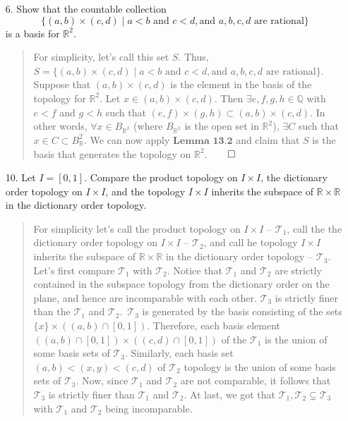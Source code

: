 \documentclass[12pt, a4paper]{article}
\newcommand{\rats}{\mathbb{Q}} %
\newcommand{\reals}{\mathbb{R}} %
\newcommand{\topology}{\mathcal{T}} %
\newcommand\und[1]{\underline{\smash{#1}}}
\begin{document}
\begin{itemize}
\item[6.]
Show that the countable collection
$$\{(a, b) \times (c, d) \mid a < b \mbox{ and } c < d, \mbox{and } a,b,c,d \mbox{ are rational}\}$$
is a basis for $\reals^2$.
\begin{quote}
For simplicity, let's call this set $S$. Thus, $S = \{(a, b) \times (c, d) \mid a < b \mbox{ and } c < d, \mbox{and } a,b,c,d \mbox{ are rational}\}$.
\newline
\newline
Suppose that $(a, b) \times (c, d)$ is the element in the basis of the topology for $\reals^2$. Let $x \in (a, b) \times (c, d)$.
Then $\exists e, f, g, h \in \rats$ with $e < f$ and $g < h$ such that $(e, f) \times (g, h) \subset (a, b) \times (c, d)$.
In other words, $\forall x \in B_{\reals^2}$ (where $B_{\reals^2}$ is the open set in $\reals^2$), $\exists C$ such that
$x \in C \subset B_\reals^2$. We can now apply $\textbf{Lemma 13.2}$ and claim that $S$ is the basis that generates the topology on $\reals^2$.$\qed$
\end{quote}

\item[]
\item[]

\item[10.]
Let $I = [0, 1]$. Compare the product topology on $I \times I$, the dictionary order
topology on $I \times I$, and the topology $I \times I$ inherits the subspace of $\reals \times \reals$
in the dictionary order topology.
\begin{quote}
\und{\textbf{NOTE}}
For simplicity let's call the product topology on $I \times I$ -- $\topology_1$,
call the the dictionary order topology on $I \times I$ -- $\topology_2$, and
call he topology $I \times I$ inherits the subspace of $\reals \times \reals$
in the dictionary order topology -- $\topology_3$.
\newline
\newline
Let's first compare $\topology_1$ with $\topology_2$.
Notice that $\topology_1$ and $\topology_2$ are strictly contained in the subspace
topology from the dictionary order on the plane, and hence are incomparable with each other.
\newline
\newline
$\topology_3$ is strictly finer than the $\topology_1$ and $\topology_2$.\
$\topology_3$ is generated by the basis consisting of the sets $\{x\} \times ((a, b) \cap [0, 1])$.
Therefore, each basis element $((a, b) \cap [0, 1]) \times ((c, d) \cap [0, 1])$ of the $\topology_1$ is the
union of some basis sets of $\topology_3$. Similarly, each basis set $(a, b) < (x, y) < (c, d)$ of $\topology_2$
topology is the union of some basis sets of $\topology_3$. Now, since $\topology_1$ and $\topology_2$ are not comparable, 
it follows that $\topology_3$ is strictly finer than $\topology_1$ and $\topology_2$.
\newline
\newline
At last, we got that $\topology_1, \topology_2 \subsetneq \topology_3$ with $\topology_1$ and $\topology_2$ being incomparable.
\end{quote}


\end{itemize}
\end{document}
